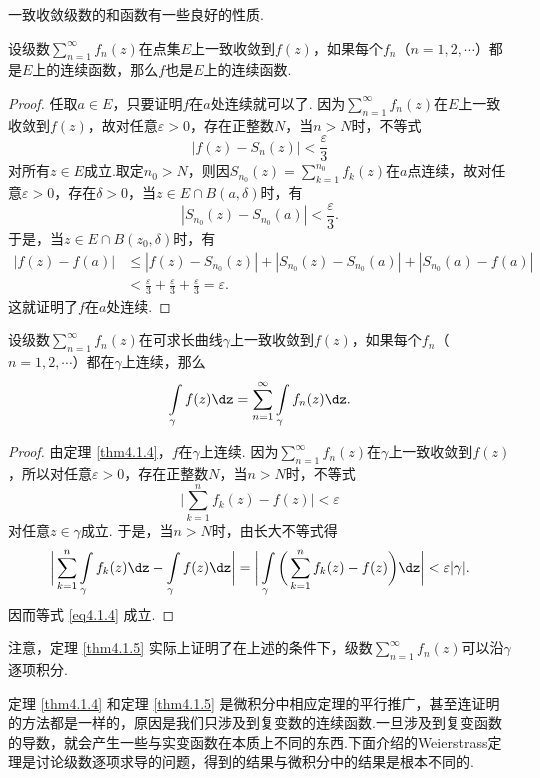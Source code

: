 一致收敛级数的和函数有一些良好的性质.
\begin{theorem}\label{thm4.1.4}
设级数$\sum_{n=1}^\infty f_n(z)$在点集$E$上一致收敛到$f(z)$，如果每个$f_n$（$n=1,2,\cdots$）都是$E$上的连续函数，那么$f$也是$E$上的连续函数.
\end{theorem}
\begin{proof}
任取$a\in E$，只要证明$f$在$a$处连续就可以了. 因为$\sum_{n=1}^\infty f_n(z)$在$E$上一致收敛到$f(z)$，故对任意$\varepsilon>0$，存在正整数$N$，当$n>N$时，不等式
\[|f(z)-S_n(z)|<\frac\varepsilon3\]
对所有$z\in E$成立.取定$n_0>N$，则因$S_{n_0}(z)=\sum_{k=1}^{n_0}f_k(z)$在$a$点连续，故对任意$\varepsilon>0$，存在$\delta>0$，当$z\in E\cap B(a,\delta)$时，有
\[|S_{n_0}(z)-S_{n_0}(a)|<\frac\varepsilon3.\]
于是，当$z\in E\cap B(z_0,\delta)$时，有
\begin{align*}
|f(z)-f(a)|&\le|f(z)-S_{n_0}(z)|+|S_{n_0}(z)-S_{n_0}(a)|+|S_{n_0}(a)-f(a)|\\
&<\frac\varepsilon3+\frac\varepsilon3+\frac\varepsilon3=\varepsilon.
\end{align*}
这就证明了$f$在$a$处连续.
\end{proof}

\begin{theorem}\label{thm4.1.5}
设级数$\sum_{n=1}^\infty f_n(z)$在可求长曲线$\gamma$上一致收敛到$f(z)$，如果每个$f_n$（$n=1,2,\cdots$）都在$\gamma$上连续，那么
\begin{equation}\label{eq4.1.4}
\int\limits_\gamma f(z)\dz=\sum_{n=1}^\infty\int\limits_\gamma f_n(z)\dz.
\end{equation}
\end{theorem}
\begin{proof}
由定理 \ref{thm4.1.4}，$f$在$\gamma$上连续. 因为$\sum_{n=1}^\infty f_n(z)$在$\gamma$上一致收敛到$f(z)$，所以对任意$\varepsilon>0$，存在正整数$N$，当$n>N$时，不等式
\[\bigg|\sum_{k=1}^nf_k(z)-f(z)\bigg|<\varepsilon\]
对任意$z\in\gamma$成立. 于是，当$n>N$时，由长大不等式得
\[\bigg|\sum_{k=1}^n\int\limits_\gamma f_k(z)\dz-\int\limits_\gamma f(z)\dz\bigg|
=\bigg|\int\limits_\gamma\bigg(\sum_{k=1}^nf_k(z)-f(z)\bigg)\dz\bigg|
<\varepsilon|\gamma|.\]
因而等式 \eqref{eq4.1.4} 成立.
\end{proof}

注意，定理 \ref{thm4.1.5} 实际上证明了在上述的条件下，级数$\sum_{n=1}^\infty f_n(z)$可以沿$\gamma$逐项积分.

定理 \ref{thm4.1.4} 和定理 \ref{thm4.1.5} 是微积分中相应定理的平行推广，甚至连证明的方法都是一样的，原因是我们只涉及到复变数的连续函数.一旦涉及到复变函数的导数，就会产生一些与实变函数在本质上不同的东西.下面介绍的Weierstrass定理是讨论级数逐项求导的问题，得到的结果与微积分中的结果是根本不同的.

